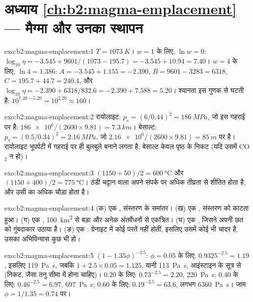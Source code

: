 \section*{अध्याय \ref{ch:b2:magma-emplacement} --- मैग्मा और उनका स्थापन}

\begin{solution}{exo:b2:magma-emplacement:1}
$T = \qty{1073}{K}$। $w = 1$ के लिए, $\ln w = 0$: $\log_{10}\eta = -3.545 +
9601/(1073 - 195.7) = -3.545 + 10.94 = 7.40$। $w = 4$ के लिए, $\ln 4 = 1.386$:
$A = -3.545 + 1.155 = -2.390$, $B = 9601 - 3283 = 6318$, $C = 195.7 + 44.7 =
240.4$, और $\log_{10}\eta = -2.390 + 6318/832.6 = -2.390 + 7.588 = 5.20$।
श्यानता इस गुणक से घटती है: $10^{7.40 - 5.20} = 10^{2.20} \approx 160$।
\end{solution}

\begin{solution}{exo:b2:magma-emplacement:2}
रायोलाइट: $p_s = (6/0.44)^2 = \qty{186}{MPa}$, जो इस गहराई पर है: $\num{186e6}/(2600\times9.81)
= \qty{7.3}{km}$। बेसाल्ट: $p_s = (0.5/0.34)^2 = \qty{2.16}{MPa}$, जो
$\num{2.16e6}/(2600\times9.81) = \qty{85}{m}$ पर है। रायोलाइट भूपर्पटी में गहराई पर ही बुलबुले
बनाने लगता है, बेसाल्ट केवल पृष्ठ के निकट (यदि उसमें CO$_2$ न हो)।
\end{solution}

\begin{solution}{exo:b2:magma-emplacement:3}
$(1150 + 50)/2 = \qty{600}{\celsius}$ और $(1150 + 400)/2 = \qty{775}{\celsius}$। ठंडी
चट्टान वाला  अपने संपर्क पर अधिक तीव्रता से शीतित होता है, और उसी का
 अधिक चौड़ा होता है।
\end{solution}

\begin{solution}{exo:b2:magma-emplacement:4}
(क) एक , संस्तरण के समांतर। (ख) एक , संस्तरण को काटता हुआ।
(ग) एक , \qty{100}{km^2} से बड़ा और अनेक अंतर्वेधनों से एकत्रित। (घ) एक
, जिसने अपनी छत को गुंबदाकार उठाया है। (ङ) एक : ग्रेनाइट में कोई परतें नहीं होतीं,
इसलिए उसमें कोई भी चादर  है, उसका अभिविन्यास कुछ भी हो।
\end{solution}

\begin{solution}{exo:b2:magma-emplacement:5}
$(1 - 1.35\phi)^{-2.5}$: $\phi = 0.05$ के लिए, $0.9325^{-2.5} = 1.19$, इसलिए
\qty{119}{Pa.s}, जबकि $1 + 2.5\times0.05 = 1.125$, यानी \qty{113}{Pa.s}, आइंस्टाइन के
सूत्र से (निकट, जैसा तनु सीमा में होना चाहिए)। $0.20$ के लिए: $0.73^{-2.5} =
2.20$, \qty{220}{Pa.s}; $0.40$ के लिए: $0.46^{-2.5} = 6.97$, \qty{697}{Pa.s}; $0.60$ के लिए:
$0.19^{-2.5} = 63.6$, लगभग \qty{6360}{Pa.s}। जाम $\phi = 1/1.35 = 0.74$ पर।
\end{solution}

